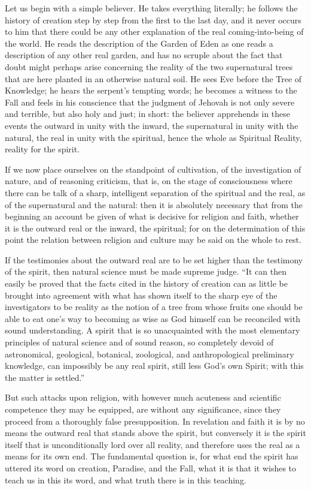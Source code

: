 \documentclass[12pt,a4paper,openany]{book}
\newcommand{\opage}[1]{\marginnote{\footnotesize\textit{[#1]}}}
\begin{document}
Let us begin with a simple believer. He
takes everything literally; he follows the history of creation
step by step from the first to the last day, and it
never occurs to him that there could be any other
explanation of the real coming-into-being of the world. He reads
the description of the Garden of Eden as one reads a description
of any other real garden, and has
no scruple about the fact that doubt might perhaps arise
concerning the reality of the two supernatural
trees that are here planted in an otherwise natural
soil. He sees Eve before the Tree of Knowledge; he
hears the serpent's tempting words; he becomes a witness to the Fall
and feels in his conscience that the judgment of Jehovah is not
only severe and terrible, but also holy and just;
in short: the believer apprehends in these events
the outward in unity with the inward, the supernatural
in unity with the natural, the real in unity
with the spiritual, hence the whole as Spiritual Reality,
reality for the spirit.

\setcounter{footnote}{0}%
\opage{302}If we now place ourselves on the standpoint of cultivation, of the investigation of nature,
and of reasoning criticism, that is, on
the stage of consciousness where there can be talk of a
sharp, intelligent separation of the spiritual and the
real, as of the supernatural and the natural:
then it is absolutely necessary that from the beginning
an account be given of what is decisive for religion and faith,
whether it is the outward real or
the inward, the spiritual; for on the determination of
this point the relation between religion and culture
may be said on the whole to rest.

If the testimonies about the outward real are
to be set higher than the testimony of the spirit, then natural science must
be made supreme judge. ``It can then
easily be proved that the facts cited in the history of creation
can as little be brought into agreement
with what has shown itself to the sharp eye of the investigators
to be reality as the notion of a tree
from whose fruits one should be able to eat one's way to becoming
as wise as God himself can be reconciled with sound
understanding. A spirit that is so unacquainted with the most elementary
principles of natural science
and of sound reason, so completely devoid of astronomical, geological,
botanical, zoological, and anthropological preliminary knowledge,
can impossibly be any real spirit, still
less God's own Spirit; with this the matter is settled.''

But such attacks upon religion, with however much
acuteness and scientific competence they may be
equipped, are without any significance, since they proceed from a
thoroughly false presupposition. In revelation and faith it is
by no means the outward real that stands above the spirit,
\setcounter{footnote}{0}%
\opage{303}but conversely it is the spirit itself that is unconditionally lord
over all reality, and therefore uses the real as
a means for its own end. The fundamental question is, for
what end the spirit has uttered its word on creation,
Paradise, and the Fall, what it is that it
wishes to teach us in this its word, and what truth there is in this
teaching.
\end{document}
